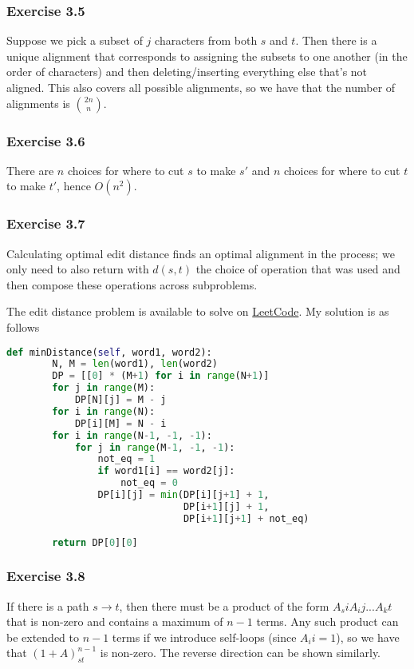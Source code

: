 \subsubsection{Exercise 3.5}
Suppose we pick a subset of $j$ characters from both $s$ and $t$. Then there is a unique alignment that 
corresponds to assigning the subsets to one another (in the order of characters) and then deleting/inserting
everything else that's not aligned. This also covers all possible alignments, so we have that the number of
alignments is $\binom{2n}{n}$.

\subsubsection{Exercise 3.6}
There are $n$ choices for where to cut $s$ to make $s'$ and $n$ choices for where to cut $t$ to make $t'$,
hence $O(n^2)$.

\subsubsection{Exercise 3.7}
Calculating optimal edit distance finds an optimal alignment in the process; we only need to also return
with $d(s, t)$ the choice of operation that was used and then compose these operations across subproblems.

The edit distance problem is available to solve on 
\href{https://leetcode.com/problems/edit-distance/}{LeetCode}. 
My solution is as follows
\begin{lstlisting}[language=python]
    def minDistance(self, word1, word2):
        N, M = len(word1), len(word2)
        DP = [[0] * (M+1) for i in range(N+1)]
        for j in range(M):
            DP[N][j] = M - j
        for i in range(N):
            DP[i][M] = N - i
        for i in range(N-1, -1, -1):
            for j in range(M-1, -1, -1):
                not_eq = 1
                if word1[i] == word2[j]:
                    not_eq = 0
                DP[i][j] = min(DP[i][j+1] + 1,
                               DP[i+1][j] + 1,
                               DP[i+1][j+1] + not_eq)
                
        return DP[0][0]
\end{lstlisting}

\subsubsection{Exercise 3.8}
If there is a path $s \to t$, then there must be a product of the form $A_si A_ij ... A_kt$ that is non-zero 
and contains a maximum of $n-1$ terms. Any such product can be extended to $n-1$ terms if we introduce
self-loops (since $A_ii = 1$), so we have that $(1 + A)_{st}^{n-1}$ is non-zero. The reverse direction can
be shown similarly.

